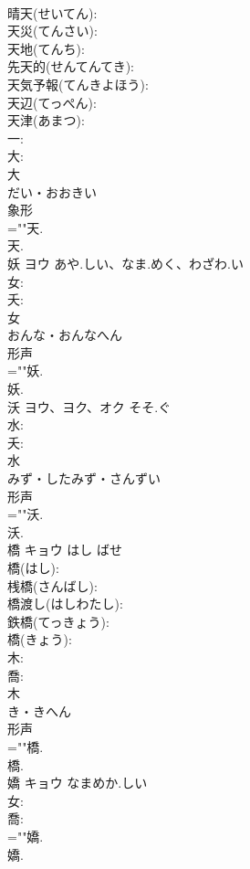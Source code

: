 \documentclass[8pt]{extreport}
\begin{document}
\begin{CJK}{UTF8}{min}
\\	晴天(せいてん): 
\\	天災(てんさい): 
\\	天地(てんち): 
\\	先天的(せんてんてき): 
\\	天気予報(てんきよほう): 
\\	天辺(てっぺん): 
\\	天津(あまつ): 
\\	一: 
\\	大: 
\\	大	
\\	だい・おおきい	
\\	象形 
\\	=""天.
\\	天.
\\	妖	ヨウ	あや.しい、なま.めく、わざわ.い		
\\	女: 
\\	夭: 
\\	女	
\\	おんな・おんなへん	
\\	形声 
\\	=""妖.
\\	妖.
\\	沃	ヨウ、ヨク、オク	そそ.ぐ		
\\	水: 
\\	夭: 
\\	水	
\\	みず・したみず・さんずい	
\\	形声 
\\	=""沃.
\\	沃.
\\	橋	キョウ	はし	ばせ	
\\	橋(はし): 
\\	桟橋(さんばし): 
\\	橋渡し(はしわたし): 
\\	鉄橋(てっきょう): 
\\	橋(きょう): 
\\	木: 
\\	喬: 
\\	木	
\\	き・きへん	
\\	形声 
\\	=""橋.
\\	橋.
\\	嬌	キョウ	なまめか.しい		
\\	女: 
\\	喬: 
\\	=""嬌.
\\	嬌.

\end{CJK}
\end{document}
